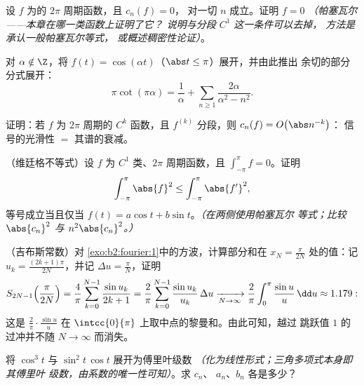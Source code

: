 \begin{exercise}[$\star\star$]\label{exo:b2:fourier:4}
设 $f$ 为的 $2\pi$ 周期函数，且 $c_n(f) = 0$，
对一切 $n$ 成立。证明 $f = 0$ \emph{（帕塞瓦尔——本章在哪一类函数上证明了它？
说明与分段 $C^1$ 这一条件可以去掉，
方法是承认一般帕塞瓦尔等式，
或概述稠密性论证）}。
\end{exercise}

\begin{exercise}[$\star\star$]\label{exo:b2:fourier:5}
对 $\alpha \notin \Z$，将 $f(t) = \cos(\alpha t)$（$\abs t
\leq \pi$）展开，并由此推出
余切的部分分式展开：
\[
\pi\cot(\pi\alpha) = \frac{1}{\alpha} + \sum_{n\geq1}
\frac{2\alpha}{\alpha^2 - n^2} .
\]
\end{exercise}

\begin{exercise}[$\star\star$]\label{exo:b2:fourier:6}
证明：若 $f$ 为 $2\pi$ 周期的 $C^k$ 函数，且 $f^{(k)}$
分段，则 $c_n(f) = O\bigl(\abs n^{-k}\bigr)$：
信号的光滑性 $=$ 其谱的衰减。
\end{exercise}

\begin{exercise}[$\star\star\star$]\label{exo:b2:fourier:7}
（维廷格不等式）设 $f$ 为 $C^1$ 类、$2\pi$ 周期函数，且
$\int_{-\pi}^{\pi} f = 0$。证明
\[
\int_{-\pi}^{\pi} \abs{f}^2 \leq \int_{-\pi}^{\pi} \abs{f'}^2 ,
\]
等号成立当且仅当 $f(t) = a\cos t + b\sin t$。\emph{（在两侧使用帕塞瓦尔
等式；比较 $\abs{c_n}^2$ 与 $n^2\abs{c_n}^2$。）}
\end{exercise}

\begin{exercise}[$\star\star\star$]\label{exo:b2:fourier:8}
（吉布斯常数）对
\cref{exo:b2:fourier:1}中的方波，计算部分和在 $x_N =
\frac{\pi}{2N}$ 处的值：记 $u_k = \frac{(2k+1)\pi}{2N}$，并记 $\Delta u
= \frac{\pi}{N}$，证明
\[
S_{2N-1}\Bigl(\frac{\pi}{2N}\Bigr)
= \frac{4}{\pi}\sum_{k=0}^{N-1} \frac{\sin u_k}{2k+1}
= \frac{2}{\pi}\sum_{k=0}^{N-1} \frac{\sin u_k}{u_k}\,\Delta u
\xrightarrow[N\to\infty]{}
\frac{2}{\pi}\int_0^{\pi}\frac{\sin u}{u}\,\dd u \approx 1.179 :
\]
这是 $\frac{2}{\pi}\cdot\frac{\sin u}{u}$ 在
$\intcc{0}{\pi}$ 上取中点的黎曼和。由此可知，越过
跳跃值 $1$ 的过冲并不随 $N \to \infty$ 而消失。
\end{exercise}

\begin{exercise}[$\star$]\label{exo:b2:fourier:9}
将 $\cos^3 t$ 与 $\sin^2 t\,\cos t$ 展开为傅里叶级数
\emph{（化为线性形式；三角多项式本身即其傅里叶
级数，由系数的唯一性可知）}。求 $c_n$、
$a_n$、$b_n$ 各是多少？
\end{exercise}

